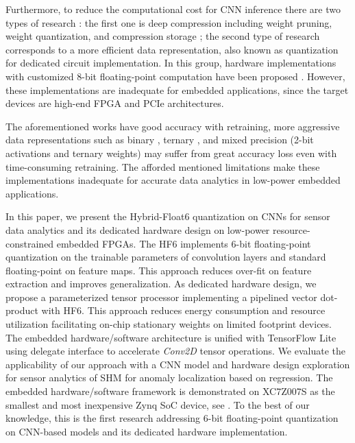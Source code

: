 Furthermore, to reduce the computational cost for CNN inference there are two types of research \cite{wu2021low}: the first one is deep compression including weight pruning, weight quantization, and compression storage \cite{han2015deep,han2015learning}; the second type of research corresponds to a more efficient data representation, also known as quantization for dedicated circuit implementation. In this group, hardware implementations with customized 8-bit floating-point computation have been proposed \cite{mei2017200mhz, wu2021low, lian2019high}. However, these implementations are inadequate for embedded applications, since the target devices are high-end FPGA and PCIe architectures.

The aforementioned works have good accuracy with retraining, more aggressive data representations such as binary \cite{courbariaux2015binaryconnect}, ternary \cite{lin2015neural}, and mixed precision (2-bit activations and ternary weights) \cite{colangelo2018exploration} may suffer from great accuracy loss even with time-consuming retraining. The afforded mentioned limitations make these implementations inadequate for accurate data analytics in low-power embedded applications.

In this paper, we present the Hybrid-Float6 quantization on CNNs for sensor data analytics and its dedicated hardware design on low-power resource-constrained embedded FPGAs. The HF6 implements 6-bit floating-point quantization on the trainable parameters of convolution layers and standard floating-point on feature maps. This approach reduces over-fit on feature extraction and improves generalization. As dedicated hardware design, we propose a parameterized tensor processor implementing a pipelined vector dot-product with HF6. This approach reduces energy consumption and resource utilization facilitating on-chip stationary weights on limited footprint devices. The embedded hardware/software architecture is unified with TensorFlow Lite using delegate interface to accelerate \emph{Conv2D} tensor operations. We evaluate the applicability of our approach with a CNN model and hardware design exploration for sensor analytics of SHM for anomaly localization based on regression. The embedded hardware/software framework is demonstrated on XC7Z007S as the smallest and most inexpensive Zynq SoC device, see . To the best of our knowledge, this is the first research addressing 6-bit floating-point quantization on CNN-based models and its dedicated hardware implementation.


